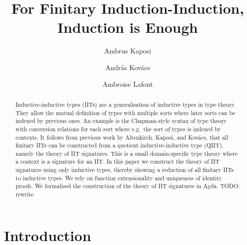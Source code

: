 \documentclass[a4paper,UKenglish,cleveref, autoref]{lipics-v2019}
\title{For Finitary Induction-Induction, \\ Induction is Enough} %
\author{Ambrus Kaposi}{E{\"o}tv{\"o}s Lor{\'a}nd University, Budapest, Hungary}{akaposi@inf.elte.hu}{https://orcid.org/0000-0001-9897-8936}{this author was supported by Thematic Excellence Programme, Industry and Digitization Subprogramme (NRDI Office, 2019) and by the European Union, co-financed by the European Social Fund (EFOP-3.6.2-16-2017-00013, Thematic Fundamental Research Collaborations Grounding Innovation in Informatics and Infocommunication).}%
\author{Andr{\'a}s Kov{\'a}cs}{E{\"o}tv{\"o}s Lor{\'a}nd University, Budapest, Hungary}{kovacsandras@inf.elte.hu}{https://orcid.org/0000-0002-6375-9781}{this author was supported by the European Union, co-financed by the European Social Fund (EFOP-3.6.3-VEKOP-16-2017-00002).}
\author{Ambroise Lafont}{IMT Atlantique, Inria, LS2N CNRS, Nantes, France}{ambroise.lafont@inria.fr}{https://orcid.org/0000-0002-9299-641X}{}
\begin{document}
\maketitle

\begin{abstract}
  Inductive-inductive types (IITs) are a generalisation of inductive types in
  type theory. They allow the mutual definition of types with multiple sorts
  where later sorts can be indexed by previous ones. An example is the
  Chapman-style syntax of type theory with conversion relations for each sort
  where e.g.\ the sort of types is indexed by contexts. It follows from previous
  work by Altenkirch, Kaposi, and Kov{\'a}cs, that all finitary IITs can be constructed from a quotient
  inductive-inductive type (QIIT), namely the theory of IIT signatures. This is
  a small domain-specific type theory where a context is a signature for an
  IIT. In this paper we construct the theory of IIT signatures using only inductive types,
  thereby showing a reduction of all finitary IITs to inductive types.  We rely
  on function extensionality and uniqueness of identity proofs. We formalised
  the construction of the theory of IIT signatures in Agda. TODO: rewrite
\end{abstract}


\section{Introduction}
\label{sec:intro}
\end{document}
